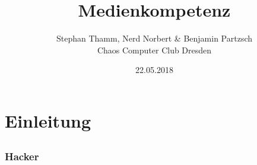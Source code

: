 \documentclass[12pt]{beamer}
\title{Medienkompetenz}
\author{\small Stephan Thamm, Nerd Norbert \& Benjamin Partzsch \\\large Chaos Computer Club Dresden}
\date{22.05.2018}
\begin{document}
\maketitle

\section{Einleitung}
\subsection{}


\begin{frame}
  \frametitle{Hacker}
  \begin{figure}

\end{figure}
\end{frame}
\end{document}
